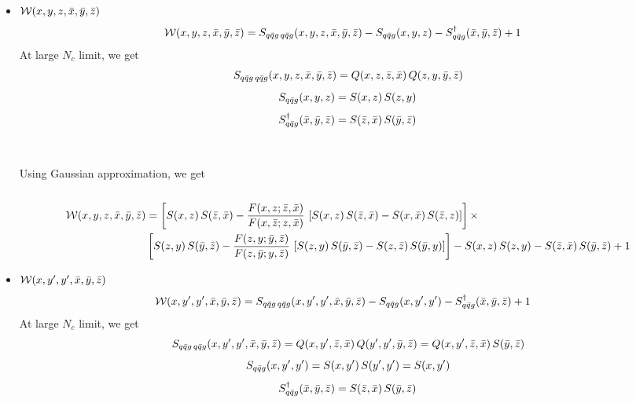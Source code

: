 \documentclass[9pt]{article}
\numberwithin{equation}{section}
\begin{document}
\begin{itemize}
    \item $\mathcal{W}(x,y,z,\Bar{x},\Bar{y},\Bar{z})$
    \begin{align}
        \mathcal{W}(x,y,z,\Bar{x},\Bar{y},\Bar{z}) & = S_{q\Bar{q}g\,q\Bar{q}g}(x,y,z,\Bar{x},\Bar{y},\Bar{z}) -S_{q\Bar{q}g}(x,y,z) - S^{\dagger}_{q\Bar{q}g}(\Bar{x},\Bar{y},\Bar{z}) + 1
    \end{align}
At large $N_{c}$ limit, we get
$$S_{q\Bar{q}g\,q\Bar{q}g}(x,y,z,\Bar{x},\Bar{y},\Bar{z}) = Q(x,z,\Bar{z},\Bar{x})\, Q(z,y,\Bar{y},\Bar{z})$$
$$S_{q\Bar{q}g}(x,y,z) = S(x,z)\, S(z,y)$$
$$S^{\dagger}_{q\Bar{q}g}(\Bar{x},\Bar{y},\Bar{z}) = S(\Bar{z},\Bar{x})\, S(\Bar{y},\Bar{z})$$
\\ \\ 
Using Gaussian approximation, we get \\  \\ 
\begin{align}
\mathcal{W}(x,y,z,\Bar{x},\Bar{y},\Bar{z})  & = \left[S(x,z)\,S(\Bar{z},\Bar{x}) - \frac{F(x,z;\Bar{z},\Bar{x})}{F(x,\Bar{z};z,\Bar{x})}\, \left[S(x,z)\,S(\Bar{z},\Bar{x})-S(x,\Bar{x})\, S(\Bar{z},z)\right]\right]\times \notag \\ & \left[S(z,y)\,S(\Bar{y},\Bar{z}) - \frac{F(z,y;\Bar{y},\Bar{z})}{F(z,\Bar{y};y,\Bar{z})}\,\left[S(z,y)\,S(\Bar{y},\Bar{z})-S(z,\Bar{z})\,S(\Bar{y},y)\right]\right] - S(x,z)\, S(z,y) - S(\Bar{z},\Bar{x})\, S(\Bar{y},\Bar{z}) +1
\end{align}
\item $\mathcal{W}(x,y',y',\Bar{x},\Bar{y},\Bar{z})$
\begin{align}
        \mathcal{W}(x,y',y',\Bar{x},\Bar{y},\Bar{z}) & = S_{q\Bar{q}g\,q\Bar{q}g}(x,y',y',\Bar{x},\Bar{y},\Bar{z}) -S_{q\Bar{q}g}(x,y',y') - S^{\dagger}_{q\Bar{q}g}(\Bar{x},\Bar{y},\Bar{z}) + 1
    \end{align}
At large $N_{c}$ limit, we get
$$S_{q\Bar{q}g\,q\Bar{q}g}(x,y',y',\Bar{x},\Bar{y},\Bar{z}) = Q(x,y',\Bar{z},\Bar{x})\, Q(y',y',\Bar{y},\Bar{z}) = Q(x,y',\Bar{z},\Bar{x})\, S(\Bar{y},\Bar{z})$$
$$S_{q\Bar{q}g}(x,y',y') = S(x,y')\, S(y',y') = S(x,y') $$
$$S^{\dagger}_{q\Bar{q}g}(\Bar{x},\Bar{y},\Bar{z}) = S(\Bar{z},\Bar{x})\, S(\Bar{y},\Bar{z})$$
 \\ \\ 

\end{itemize}
\end{document}
